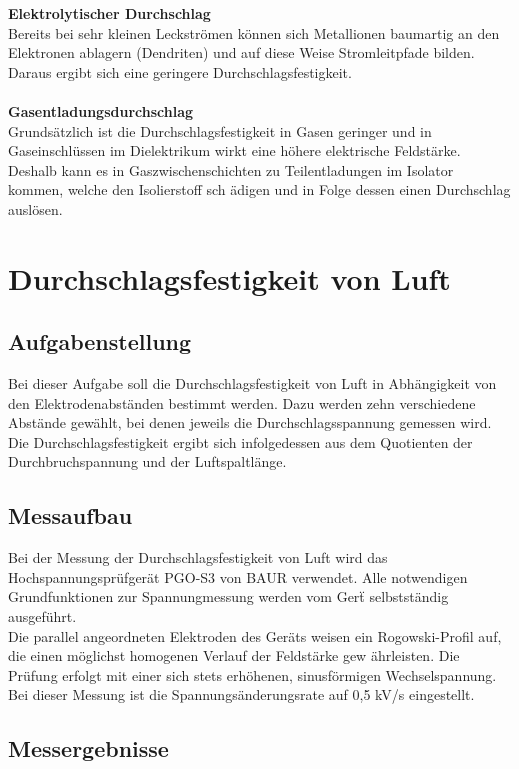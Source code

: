\documentclass[a4paper,twoside,12pt,DIV=13,BCOR=5mm,numbers=noenddot,cleardoublepage=empty]{scrbook}
\begin{document}
		\textbf{Elektrolytischer Durchschlag}
			\\
			Bereits bei sehr kleinen Leckstr\"omen k\"onnen sich Metallionen baumartig an den Elektronen ablagern (Dendriten) und auf diese Weise 
			Stromleitpfade bilden. Daraus ergibt sich eine geringere Durchschlagsfestigkeit.
			\\
			\\
		\textbf{Gasentladungsdurchschlag}
			\\
			Grunds\"atzlich ist die Durchschlagsfestigkeit in Gasen geringer und in Gaseinschl\"ussen im Dielektrikum wirkt eine h\"ohere 
			elektrische Feldst\"arke. Deshalb kann es in Gaszwischenschichten zu Teilentladungen im Isolator kommen, welche den Isolierstoff sch
			\"adigen und in Folge dessen einen Durchschlag ausl\"osen.
		
	\section{Durchschlagsfestigkeit von Luft}

		\subsection{Aufgabenstellung}
			Bei dieser Aufgabe soll die Durchschlagsfestigkeit von Luft in 
            Abh\"angigkeit von den Elektrodenabst\"anden bestimmt werden. 
			Dazu werden zehn verschiedene Abst\"ande gew\"ahlt, bei denen jeweils 
			die Durchschlagsspannung gemessen wird. Die Durchschlagsfestigkeit ergibt sich infolgedessen aus dem Quotienten der Durchbruchspannung und der Luftspaltl\"ange.		\\
		\subsection{Messaufbau}
			Bei der Messung der Durchschlagsfestigkeit von Luft wird das 
			Hochspannungspr\"ufger\"at PGO-S3 von BAUR verwendet. 
			Alle notwendigen Grundfunktionen zur Spannungmessung werden vom
			Ger\"t selbstst\"andig ausgef\"uhrt. \\
			Die parallel angeordneten Elektroden des Ger\"ats weisen ein 
			Rogowski-Profil auf, die 
			einen m\"oglichst homogenen Verlauf der Feldst\"arke gew
			\"ahrleisten. 
			Die Pr\"ufung erfolgt mit einer sich stets erh\"ohenen, sinusf\"ormigen Wechselspannung. 
			Bei dieser Messung ist die Spannungs\"anderungsrate auf 0,5 kV/s eingestellt.
		\subsection{Messergebnisse}
			
\end{document}
